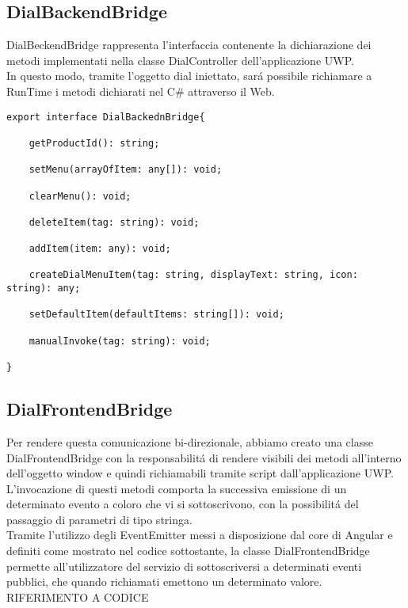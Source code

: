 \newpage
\subsection{DialBackendBridge}

DialBeckendBridge rappresenta l'interfaccia contenente la dichiarazione dei metodi implementati nella classe DialController dell'applicazione UWP.\\
In questo modo, tramite l'oggetto dial iniettato, sará possibile richiamare a RunTime i metodi dichiarati nel C\# attraverso il Web.\\

\vspace{1.0cm}
\begin{lstlisting}[caption={Interfaccia DialBackendBridge},style=javaScriptCode]
export interface DialBackednBridge{
		
	getProductId(): string;
	
	setMenu(arrayOfItem: any[]): void;
	
	clearMenu(): void;
	
	deleteItem(tag: string): void;
	
	addItem(item: any): void;
	
	createDialMenuItem(tag: string, displayText: string, icon: string): any;
	
	setDefaultItem(defaultItems: string[]): void;
	
	manualInvoke(tag: string): void;		

}		
\end{lstlisting} 
\vspace{1.0cm}

\newpage
\subsection{DialFrontendBridge}

Per rendere questa comunicazione bi-direzionale, abbiamo creato una classe DialFrontendBridge con la responsabilitá di rendere visibili dei metodi all'interno dell'oggetto window e quindi richiamabili tramite script dall'applicazione UWP.\\

L'invocazione di questi metodi comporta la successiva emissione di un determinato evento a coloro che vi si sottoscrivono, con la possibilitá del passaggio di parametri di tipo stringa.\\

Tramite l'utilizzo degli EventEmitter messi a disposizione dal core di Angular e definiti come mostrato nel codice sottostante, la classe DialFrontendBridge permette all'utilizzatore del servizio di sottoscriversi a determinati eventi pubblici, che quando richiamati emettono un determinato valore. RIFERIMENTO A CODICE \\

